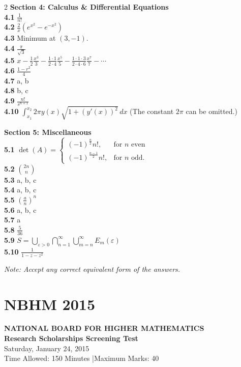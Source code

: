 \documentclass[11pt,a4paper]{article}
\newcommand{\examheader}[4]{%
  \clearpage
  \section{#1}
  \begin{center}
    {\large\bfseries NATIONAL BOARD FOR HIGHER MATHEMATICS}\\[3pt]
    {\bfseries #2}\\[2pt]
    {#3}\\[2pt]
    {\small #4}
  \end{center}
  \vspace{4pt}
}
\begin{document}
\begin{multicols}{2}
\medskip
\textbf{Section 4: Calculus \& Differential Equations}\\
\textbf{4.1} $\frac{1}{n!}$\\
\textbf{4.2} $\frac{2}{x}(e^{x^2} - e^{-x^2})$\\
\textbf{4.3} Minimum at $(3, -1)$.\\
\textbf{4.4} $\frac{\pi}{\sqrt{3}}$\\
\textbf{4.5} $x - \frac{1}{2}\frac{x^3}{3} - \frac{1\cdot 1}{2\cdot 4}\frac{x^5}{5} - \frac{1\cdot 1\cdot 3}{2\cdot 4\cdot 6}\frac{x^7}{7} - \cdots$\\
\textbf{4.6} $\frac{1 - r^2}{4}$\\
\textbf{4.7} a, b\\
\textbf{4.8} b, c\\
\textbf{4.9} $\frac{n!}{s^{n+1}}$\\
\textbf{4.10} $\int_{x_1}^{x_2} 2\pi y(x)\sqrt{1 + (y'(x))^2}\,dx$ (The constant $2\pi$ can be omitted.)

\medskip
\textbf{Section 5: Miscellaneous}\\
\textbf{5.1} $\det(A) = \begin{cases} (-1)^{\frac{n}{2}} n!, & \text{for } n \text{ even} \\ (-1)^{\frac{n-1}{2}} n!, & \text{for } n \text{ odd.} \end{cases}$\\
\textbf{5.2} $\binom{2n}{n}$\\
\textbf{5.3} a, b, c\\
\textbf{5.4} a, b, c\\
\textbf{5.5} $\left(\frac{a}{n}\right)^n$\\
\textbf{5.6} a, b, c\\
\textbf{5.7} a\\
\textbf{5.8} $\frac{5}{36}$\\
\textbf{5.9} $S = \bigcup_{\varepsilon > 0} \bigcap_{n=1}^{\infty} \bigcup_{m=n}^{\infty} E_m(\varepsilon)$\\
\textbf{5.10} $\frac{1}{1 - z - z^2}$

\medskip
\noindent\emph{Note: Accept any correct equivalent form of the answers.}
\end{multicols}
\examheader{NBHM 2015}{Research Scholarships Screening Test}{Saturday, January 24, 2015}{Time Allowed: 150 Minutes \quad|\quad Maximum Marks: 40}
\end{document}
